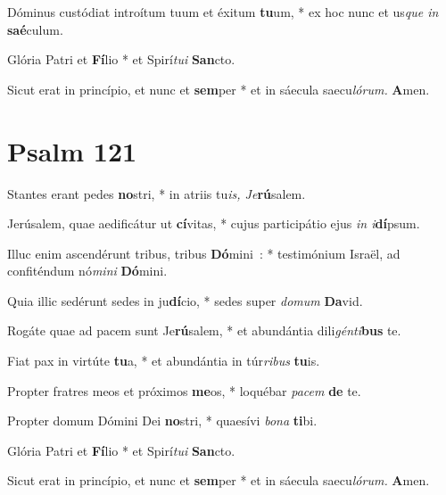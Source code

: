 \documentclass[a5paper, 12pt]{article}
\begin{document}
Dóminus custódiat introítum tuum et éxitum \textbf{tu}um, * ex hoc nunc et us\textit{que in} \textbf{saé}culum.

Glória Patri et \textbf{Fí}lio * et Spirí\textit{tui} \textbf{San}cto.

Sicut erat in princípio, et nunc et \textbf{sem}per * et in sáecula saecu\textit{lórum.} \textbf{A}men.



\section{Psalm 121}



Stantes erant pedes \textbf{no}stri, * in atriis tu\textit{is, Je}\textbf{rú}salem.

Jerúsalem, quae aedificátur ut \textbf{cí}vitas, * cujus participátio ejus \textit{in i}\textbf{dí}psum.

Illuc enim ascendérunt tribus, tribus \textbf{Dó}mini~: * testimónium Israël, ad confiténdum nó\textit{mini} \textbf{Dó}mini.

Quia illic sedérunt sedes in ju\textbf{dí}cio, * sedes super \textit{domum} \textbf{Da}vid.

Rogáte quae ad pacem sunt Je\textbf{rú}salem, * et abundántia dili\textit{génti}\textbf{bus} te.

Fiat pax in virtúte \textbf{tu}a, * et abundántia in túr\textit{ribus} \textbf{tu}is.

Propter fratres meos et próximos \textbf{me}os, * loquébar \textit{pacem} \textbf{de} te.

Propter domum Dómini Dei \textbf{no}stri, * quaesívi \textit{bona} \textbf{ti}bi.

Glória Patri et \textbf{Fí}lio * et Spirí\textit{tui} \textbf{San}cto.

Sicut erat in princípio, et nunc et \textbf{sem}per * et in sáecula saecu\textit{lórum.} \textbf{A}men.
\end{document}
